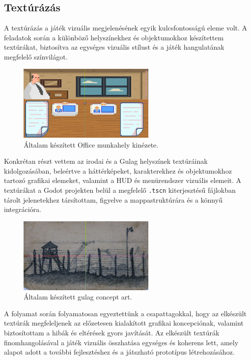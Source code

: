 \documentclass[12pt,a4paper]{article}
\begin{document}
\subsection{Textúrázás}

A textúrázás a játék vizuális megjelenésének egyik kulcsfontosságú eleme volt. A feladatok során a különböző helyszínekhez és objektumokhoz készítettem textúrákat, biztosítva az egységes vizuális stílust és a játék hangulatának megfelelő színvilágot. 

\begin{figure}[h]
    \centering
    \includegraphics[width=0.6\textwidth]{latex/images/office_concept.png}
    \caption{Általam készített Office munkahely kinézete.}
    \label{fig:office}
\end{figure}

Konkrétan részt vettem az irodai és a Gulag helyszínek textúráinak kidolgozásában, beleértve a háttérképeket, karakterekhez és objektumokhoz tartozó grafikai elemeket, valamint a HUD és menürendszer vizuális elemeit. A textúrákat a Godot projekten belül a megfelelő \texttt{.tscn} kiterjesztésű fájlokban tárolt jelenetekhez társítottam, figyelve a mappastruktúrára és a könnyű integrációra.

\begin{figure}[h]
    \centering
    \includegraphics[width=0.6\textwidth]{latex/images/gulag_concept.png}
    \caption{Általam készített gulag concept art.}
    \label{fig:gulag}
\end{figure}

A folyamat során folyamatosan egyeztettünk a csapattagokkal, hogy az elkészült textúrák megfeleljenek az előzetesen kialakított grafikai koncepciónak, valamint biztosítottam a hibák és eltérések gyors javítását. Az elkészült textúrák finomhangolásával a játék vizuális összhatása egységes és koherens lett, amely alapot adott a további fejlesztéshez és a játszható prototípus létrehozásához.
\end{document}
